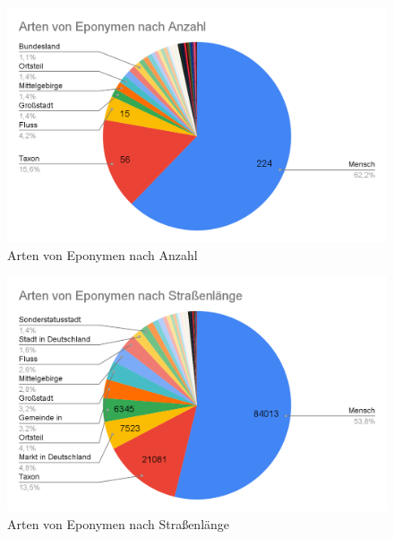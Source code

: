 \documentclass[ngerman,twocolumn,showpacs,%
  nofootinbib,aps,superscriptaddress,%
  eqsecnum,prd,notitlepage,showkeys,10pt,report]{revtex4-2}
\begin{document}
\begin{figure}
  \centering
  \includegraphics[width=1\linewidth,frame]{1.png}
  \caption{Arten von Eponymen nach Anzahl}
  \label{fig:TypesByCount}
\end{figure}
\begin{figure}
  \centering
  \includegraphics[width=1\linewidth,frame]{2.png}
  \caption{Arten von Eponymen nach Straßenlänge}
  \label{fig:TypesByLength}
\end{figure}
\end{document}
